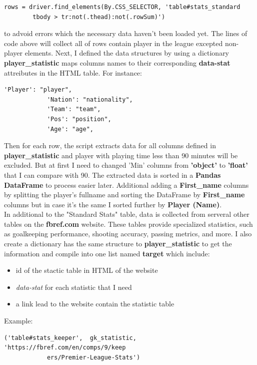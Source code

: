 \documentclass[a4paper,12pt]{article}
\begin{document}
\begin{itemize}[label= {*}, leftmargin= 1cm]
\begin{itemize}[label= {}, leftmargin= 1cm]
        \begin{Verbatim}[fontsize=\footnotesize, xleftmargin=-1cm]
        rows = driver.find_elements(By.CSS_SELECTOR, 'table#stats_standard 
        tbody > tr:not(.thead):not(.rowSum)')
        \end{Verbatim}
        
        to advoid errors which the necessary data haven't been loaded yet.
        The lines of code above will collect all of rows contain player in the league excepted non-player elements. Next, I defined the data structures by using a dictionary \textbf{player\_statistic} maps columns names to their corresponding \textbf{data-stat} attreibutes in the HTML table. For instance:

        \begin{Verbatim}[fontsize=\footnotesize, xleftmargin=-1cm]
            'Player': "player",
            'Nation': "nationality",
            'Team': "team",
            'Pos': "position",
            'Age': "age",
        \end{Verbatim}      

        Then for each row, the script extracts data for all columns defined in \textbf{player\_statistic} and player with playing time less than 90 minutes will be excluded. But at first I need to changed 'Min' columns from \textbf{'object'} to \textbf{'float'} that I can compare with 90. The extracted data is sorted in a \textbf{Pandas DataFrame} to process easier later. Additional adding a \textbf{First\_name} columns by splitting the player's fullname and sorting the DataFrame by \textbf{First\_name} columns but in case it's the same I sorted further by \textbf{Player (Name)}.\\
        
        In additional to the "Standard Stats" table, data is collected from serveral other tables on the \textbf{fbref.com} website. These tables provide specialized statistics, such as goalkeeping performance, shooting accuracy, passing metrics, and more. I also create a dictionary has the same structure to \textbf{player\_statistic} to get the information and compile into one list named \textbf{target} which include:
        \begin{itemize}[label= {+}, leftmargin= 1cm]
            \item id of the stactic table in HTML of the website
            \item \textit{data-stat} for each statistic that I need
            \item a link lead to the website contain the statistic table
        \end{itemize}
        Example:
        \begin{Verbatim}[fontsize=\footnotesize, xleftmargin=-1cm]
            ('table#stats_keeper',  gk_statistic, 'https://fbref.com/en/comps/9/keep
            ers/Premier-League-Stats')
        \end{Verbatim}
        \vspace{0.5cm}


\end{itemize}
\end{itemize}
\end{document}
